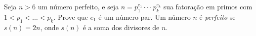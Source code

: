 Seja \(n>6\) um número perfeito, e seja \(n=p_1^{e_1}\cdot\cdot\cdot p_k^{e_k}\) sua fatoração em primos com \(1<p_1<\dots <p_k\). Prove que \(e_1\) é um número par. Um número \(n\) é \textit{perfeito} se \(s(n)=2n\), onde \(s(n)\) é a soma dos divisores de \(n\).
